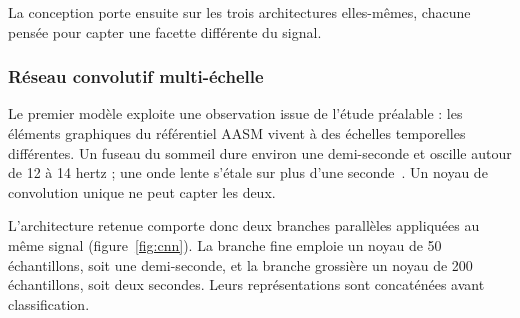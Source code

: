 La conception porte ensuite sur les trois architectures elles-mêmes, chacune pensée pour
capter une facette différente du signal.

\subsubsection{Réseau convolutif multi-échelle}

Le premier modèle exploite une observation issue de l'étude préalable : les éléments
graphiques du référentiel AASM vivent à des échelles temporelles différentes. Un fuseau
du sommeil dure environ une demi-seconde et oscille autour de 12 à 14 hertz ; une onde
lente s'étale sur plus d'une seconde~\cite{aasm2020}. Un noyau de convolution unique ne peut capter les
deux.

L'architecture retenue comporte donc deux branches parallèles appliquées au même signal
(figure~\ref{fig:cnn}). La branche fine emploie un noyau de 50 échantillons, soit une
demi-seconde, et la branche grossière un noyau de 200 échantillons, soit deux
secondes. Leurs représentations sont concaténées avant classification.

